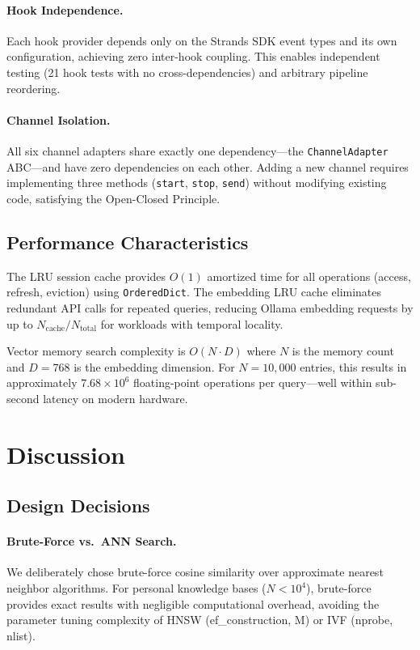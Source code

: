\documentclass[9pt,twocolumn,letterpaper]{extarticle}
\begin{document}
\paragraph{Hook Independence.}
Each hook provider depends only on the Strands SDK event types and its own configuration, achieving zero inter-hook coupling.
This enables independent testing (21 hook tests with no cross-dependencies) and arbitrary pipeline reordering.

\paragraph{Channel Isolation.}
All six channel adapters share exactly one dependency---the \texttt{ChannelAdapter} ABC---and have zero dependencies on each other.
Adding a new channel requires implementing three methods (\texttt{start}, \texttt{stop}, \texttt{send}) without modifying existing code, satisfying the Open-Closed Principle.

\subsection{Performance Characteristics}

The LRU session cache provides $O(1)$ amortized time for all operations (access, refresh, eviction) using \texttt{OrderedDict}.
The embedding LRU cache eliminates redundant API calls for repeated queries, reducing Ollama embedding requests by up to $N_{\text{cache}} / N_{\text{total}}$ for workloads with temporal locality.

Vector memory search complexity is $O(N \cdot D)$ where $N$ is the memory count and $D = 768$ is the embedding dimension.
For $N = 10{,}000$ entries, this results in approximately $7.68 \times 10^6$ floating-point operations per query---well within sub-second latency on modern hardware.

\section{Discussion}
\label{sec:discussion}

\subsection{Design Decisions}

\paragraph{Brute-Force vs.\ ANN Search.}
We deliberately chose brute-force cosine similarity over approximate nearest neighbor algorithms.
For personal knowledge bases ($N < 10^4$), brute-force provides exact results with negligible computational overhead, avoiding the parameter tuning complexity of HNSW (ef\_construction, M) or IVF (nprobe, nlist).
\end{document}
